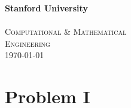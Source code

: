 \begin{titlepage}
{\color{sured} \LARGE \bf{Stanford University}}\\[0.5cm] %
\sulogo\\[1.0cm]


\textsc{\large Computational \& Mathematical\\ Engineering}\\[0.5cm] %



{\large \today}\\[3cm] %


\vfill %

\end{titlepage}

\section*{Problem I}




